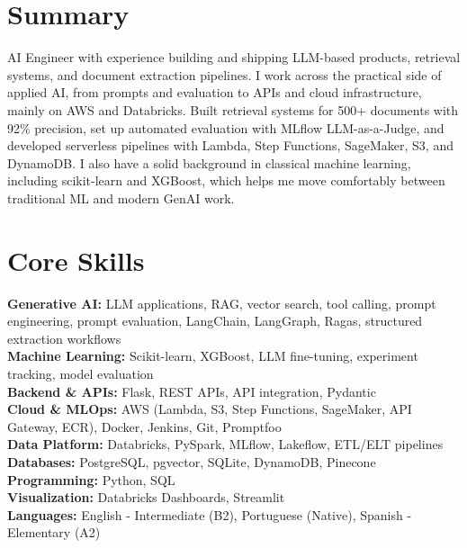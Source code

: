 \documentclass[a4paper,10pt]{article}
\begin{document}
\section{Summary}
AI Engineer with experience building and shipping LLM-based products, retrieval systems, and document extraction pipelines. I work across the practical side of applied AI, from prompts and evaluation to APIs and cloud infrastructure, mainly on AWS and Databricks. Built retrieval systems for 500+ documents with 92\% precision, set up automated evaluation with MLflow LLM-as-a-Judge, and developed serverless pipelines with Lambda, Step Functions, SageMaker, S3, and DynamoDB. I also have a solid background in classical machine learning, including scikit-learn and XGBoost, which helps me move comfortably between traditional ML and modern GenAI work.

\section{Core Skills}
\textbf{Generative AI:} LLM applications, RAG, vector search, tool calling, prompt engineering, prompt evaluation, LangChain, LangGraph, Ragas, structured extraction workflows \\
\textbf{Machine Learning:} Scikit-learn, XGBoost, LLM fine-tuning, experiment tracking, model evaluation \\
\textbf{Backend \& APIs:} Flask, REST APIs, API integration, Pydantic \\
\textbf{Cloud \& MLOps:} AWS (Lambda, S3, Step Functions, SageMaker, API Gateway, ECR), Docker, Jenkins, Git, Promptfoo \\
\textbf{Data Platform:} Databricks, PySpark, MLflow, Lakeflow, ETL/ELT pipelines \\
\textbf{Databases:} PostgreSQL, pgvector, SQLite, DynamoDB, Pinecone \\
\textbf{Programming:} Python, SQL \\
\textbf{Visualization:} Databricks Dashboards, Streamlit \\
\textbf{Languages:} English - Intermediate (B2), Portuguese (Native), Spanish - Elementary (A2)
\end{document}
